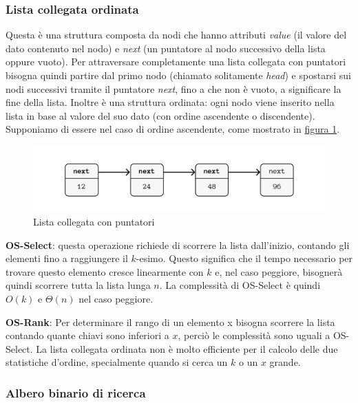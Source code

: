 \documentclass[onecolumn]{article}
\begin{document}
\subsubsection{Lista collegata ordinata}

Questa è una struttura composta da nodi che hanno attributi \textit{value} (il valore del dato contenuto nel nodo) e \textit{next} (un puntatore al nodo successivo della lista oppure vuoto). Per attraversare completamente una lista collegata con puntatori bisogna quindi partire dal primo nodo (chiamato solitamente \textit{head}) e spostarsi sui nodi successivi tramite il puntatore \textit{next}, fino a che non è vuoto, a significare la fine della lista. Inoltre è una struttura ordinata: ogni nodo viene inserito nella lista in base al valore del suo dato (con ordine ascendente o discendente). Supponiamo di essere nel caso di ordine ascendente, come mostrato in \hyperref[fig:lista]{figura 1}.

\begin{figure}
	\includegraphics[width=\linewidth]{lista.png}
	\caption{Lista collegata con puntatori}
	\label{fig:lista}
\end{figure}

\textbf{OS-Select}: questa operazione richiede di scorrere la lista dall'inizio, contando gli elementi fino a raggiungere il $k$-esimo. Questo significa che il tempo necessario per trovare questo elemento cresce linearmente con $k$ e, nel caso peggiore, bisognerà quindi scorrere tutta la lista lunga $n$. La complessità di OS-Select è quindi $O(k)$ e $\Theta(n)$ nel caso peggiore. \vspace{0.5em}

\textbf{OS-Rank}: Per determinare il rango di un elemento x bisogna scorrere la lista contando quante chiavi sono inferiori a $x$, perciò le complessità sono uguali a OS-Select. La lista collegata ordinata non è molto efficiente per il calcolo delle due statistiche d'ordine, specialmente quando si cerca un $k$ o un $x$ grande. 

\subsubsection{Albero binario di ricerca}
\end{document}
